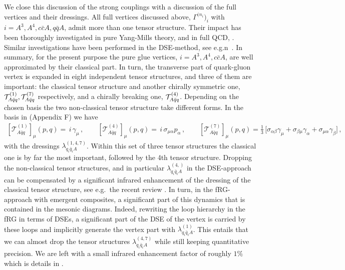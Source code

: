 \documentclass[reprint,twocolumn,superscriptaddress,preprintnumbers,amsmath,amssymb,aps,prd,floatfix]{revtex4-2}
\begin{document}
We close this discussion of the strong couplings with a discussion of the full vertices and their dressings. All full vertices discussed above, $\Gamma^{(n_i})_i$ with $i=A^3, A^4, c\bar c A, q\bar q A$, admit more than one tensor structure. Their impact has been thoroughly investigated in pure Yang-Mills theory, \cite{Cyrol:2016tym, Cyrol:2017qkl} and in full QCD, \cite{Mitter:2014wpa, Cyrol:2017ewj, Fu:2025hcm}. Similar investigations have been performed in the DSE-method, see e.g.n~\cite{Gao:2021wun}.  In summary, for the present purpose the pure glue vertices, $i= A^3, A^4, c\bar c A$, are well approximated by their classical part. In turn, the transverse part of quark-gluon vertex is expanded in eight independent tensor structures, and three of them are important: the classical tensor structure and another chirally symmetric one, ${\cal T}_{A\bar{q}q}^{(1)}, {\cal T}_{A\bar{q}q}^{(7)}$ respectively, and a chirally breaking one, ${\cal T}_{A\bar{q}q}^{(4)}$. Depending on the chosen basis the two non-classical tensor structure take different forms. In the basis in \cite{Ihssen:2024miv} (Appendix F) we have 
%
\begin{align} 
\left[\mathcal{T}_{A\bar{q}q}^{(1)}\right]_\mu(p,q) 
=\,i\,\gamma_\mu\,,\qquad \left[\mathcal{T}_{A\bar{q}q}^{(4)}\right]_\mu(p,q) 
=\,i\,\sigma_{\mu\alpha}p_\alpha\,,\qquad \left[\mathcal{T}_{A\bar{q}q}^{(7)}\right]_\mu(p,q) 
=\frac{{\textrm{1}}}{3}\, \Big[ \sigma_{\alpha\beta}\gamma_\mu + \sigma_{\beta\mu}\gamma_\alpha + \sigma_{\mu\alpha}\gamma_\beta \Big]\,, 
\label{eq:QuarkGluonTensor}
\end{align}
%
with the dressings $\lambda^{(1,4,7)}_{q_i\bar q_i A}$. Within this set of three tensor structures the classical one is by far the most important, followed by the 4th tensor structure. Dropping the non-classical tensor structures, and in particular $\lambda^{(4,)}_{q_i\bar q_i A}$ in the DSE-approach can be compensated by a significant infrared enhancement of the dressing of the classical tensor structure, see e.g.~the recent review \cite{Fischer:2026uni}. In turn, in the fRG-approach with emergent composites, a significant part of this dynamics that is contained in the mesonic diagrams. Indeed, rewriting the loop hierarchy in the fRG in terms of DSEs, a significant part of the DSE of the vertex is carried by these loops and implicitly generate the vertex part with $\lambda^{(1)}_{q_i\bar q_i A}$. This entails that we can almost drop the tensor structures $\lambda^{(4,7)}_{q_i\bar q_i A}$ while still keeping quantitative precision. We are left with a small infrared enhancement factor of roughly $1\%$ which is details in . 
\end{document}
